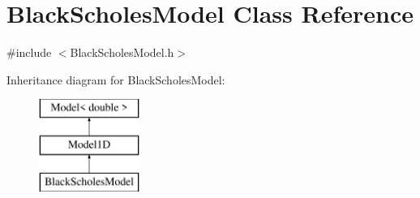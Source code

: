 \hypertarget{class_black_scholes_model}{}\section{Black\+Scholes\+Model Class Reference}
\label{class_black_scholes_model}


{\ttfamily \#include $<$Black\+Scholes\+Model.\+h$>$}

Inheritance diagram for Black\+Scholes\+Model\+:\begin{figure}[H]
\begin{center}
\leavevmode
\includegraphics[height=3.000000cm]{class_black_scholes_model}
\end{center}
\end{figure}
